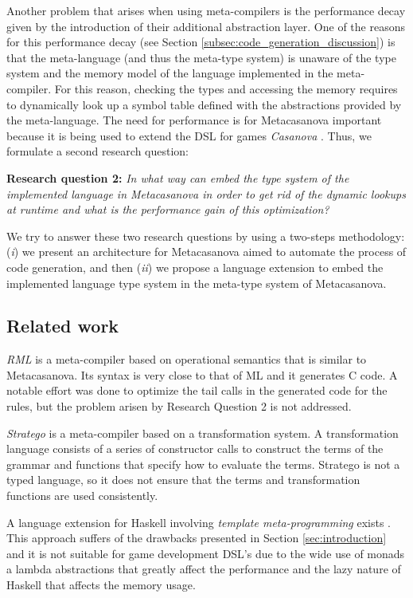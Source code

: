 \vspace{0.2cm}
Another problem that arises when using meta-compilers is the performance decay given by the introduction of their additional abstraction layer. One of the reasons for this performance decay (see Section \ref{subsec:code_generation_discussion}) is that the meta-language (and thus the meta-type system) is unaware of the type system and the memory model of the language implemented in the meta-compiler. For this reason, checking the types and accessing the memory requires to dynamically look up a symbol table defined with the abstractions provided by the meta-language. The need for performance is for Metacasanova important because it is being used to extend the DSL for games \textit{Casanova} \cite{abbadi2015casanova, abbadithesis2017}. Thus, we formulate a second research question:

\vspace{0.2cm}
\noindent
\textbf{Research question 2:} \textit{In what way can embed the type system of the implemented language in Metacasanova in order to get rid of the dynamic lookups at runtime and what is the performance gain of this optimization?}

\vspace{0.2cm}
We try to answer these two research questions by using a two-steps methodology: (\textit{i}) we present an architecture for Metacasanova aimed to automate the process of code generation, and then (\textit{ii}) we propose a language extension to embed the implemented language type system in the meta-type system of Metacasanova.

\subsection{Related work}
\textit{RML} \cite{pettersson1996compiler} is a meta-compiler based on operational semantics that is similar to Metacasanova. Its syntax is very close to that of ML and it generates C code. A notable effort was done to optimize the tail calls in the generated code for the rules, but the problem arisen by Research Question 2 is not addressed.

\textit{Stratego} \cite{bravenboer2008stratego} is a meta-compiler based on a transformation system. A transformation language consists of a series of constructor calls to construct the terms of the grammar and functions that specify how to evaluate the terms. Stratego is not a typed language, so it does not ensure that the terms and transformation functions are used consistently.

A language extension for Haskell involving \textit{template meta-programming} exists \cite{sheard2002template}. This approach suffers of the drawbacks presented in Section \ref{sec:introduction} and it is not suitable for game development DSL's due to the wide use of monads a lambda abstractions that greatly affect the performance and the lazy nature of Haskell that affects the memory usage.